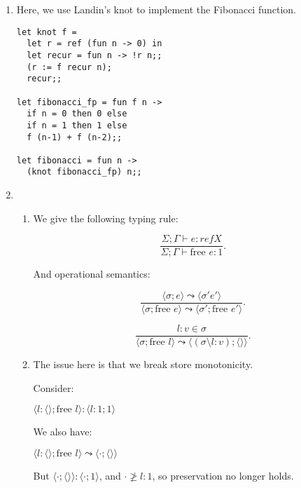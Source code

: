 


    \begin{enumerate}
      \item
        Here, we use Landin's knot to implement the Fibonacci function.

\begin{verbatim}
let knot f = 
  let r = ref (fun n -> 0) in
  let recur = fun n -> !r n;;
  (r := f recur n);
  recur;;

let fibonacci_fp = fun f n ->
  if n = 0 then 0 else
  if n = 1 then 1 else
  f (n-1) + f (n-2);;

let fibonacci = fun n ->
  (knot fibonacci_fp) n;;
\end{verbatim}

\item
  \begin{enumerate}
    \item

      We give the following typing rule:

      \[
        \frac{\Sigma;\Gamma \vdash e : ref X}{\Sigma;\Gamma \vdash \text{free }e : 1}
      .\] 

      And operational semantics:

      \[
        \frac{\langle \sigma;e \rangle \leadsto \langle \sigma' e' \rangle}{\langle \sigma;\text{free }e \rangle \leadsto \langle \sigma';\text{free }e'\rangle}
      .\] 

      \[
        \frac{l:v \in \sigma}{\langle \sigma; \text{free }l \rangle \leadsto \langle(\sigma \setminus l:v);\langle \rangle \rangle}
      .\] 

    \item
      The issue here is that we break store monotonicity.

      Consider:

      $\langle l : \langle \rangle; \text{free } l\rangle : \langle l: 1 ; 1\rangle$

      We also have:

      $\langle l : \langle \rangle; \text{free } l\rangle \leadsto \langle \cdot ; \langle \rangle \rangle$

      But $\langle \cdot ; \langle \rangle \rangle : \langle \cdot;1\rangle$, and $\cdot \not \geq l:1$, so preservation no longer holds.
  \end{enumerate}
    \end{enumerate}

